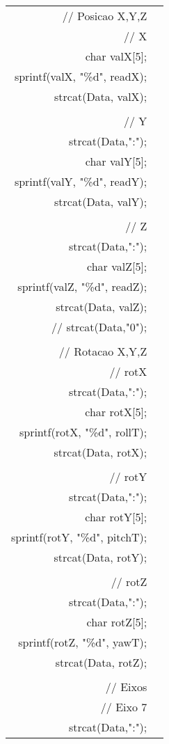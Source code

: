 \begin{longtable}{Rp{15cm}}
\qquad // Posicao X,Y,Z \\
\qquad  // X \\
\qquad  char valX[5]; \\
\qquad  sprintf(valX, "\%d", readX); \\
\qquad  strcat(Data, valX); \\
\\
\qquad  // Y \\
\qquad  strcat(Data,":"); \\
\qquad  char valY[5]; \\
\qquad  sprintf(valY, "\%d", readY);   \\
\qquad  strcat(Data, valY); \\
\\
\qquad  // Z  \\
\qquad  strcat(Data,":"); \\
\qquad  char valZ[5]; \\
\qquad  sprintf(valZ, "\%d", readZ);  \\
\qquad  strcat(Data, valZ);  \\
\qquad // strcat(Data,"0");\\
\\
\qquad // Rotacao X,Y,Z \\
\qquad  // rotX   \\
\qquad  strcat(Data,":"); \\
\qquad  char rotX[5];  \\
\qquad  sprintf(rotX, "\%d", rollT);   \\
\qquad  strcat(Data, rotX); \\
\\
\qquad  // rotY  \\
\qquad  strcat(Data,":"); \\
\qquad  char rotY[5]; \\
\qquad  sprintf(rotY, "\%d", pitchT);   \\
\qquad  strcat(Data, rotY); \\
\\
\qquad  // rotZ \\
\qquad  strcat(Data,":"); \\
\qquad  char rotZ[5]; \\
\qquad  sprintf(rotZ, "\%d", yawT);   \\
\qquad  strcat(Data, rotZ); \\
\\  
\qquad // Eixos \\
\qquad  // Eixo 7 \\
\qquad  strcat(Data,":");   \\

\end{longtable}
